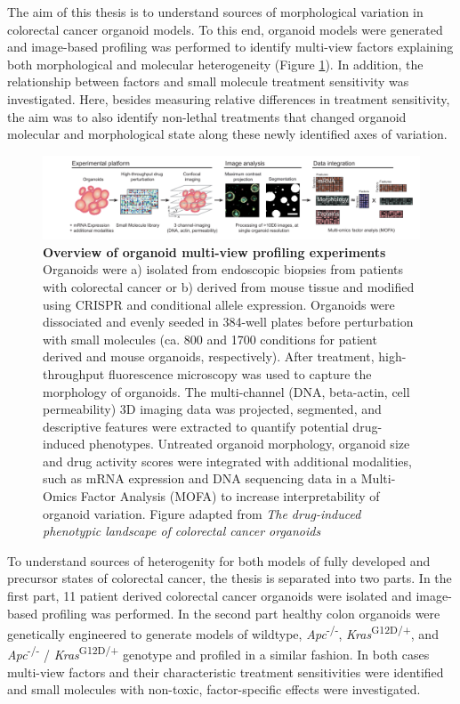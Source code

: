 \begin{flushleft}
The aim of this thesis is to understand sources of morphological variation in colorectal cancer organoid models. To this end, organoid models were generated and image-based profiling was performed to identify multi-view factors explaining both morphological and molecular heterogeneity (Figure \ref{fig_130}). In addition, the relationship between factors and small molecule treatment sensitivity was investigated. Here, besides measuring relative differences in treatment sensitivity, the aim was to also identify non-lethal treatments that changed organoid molecular and morphological state along these newly identified axes of variation.
\bigbreak

\begin{figure}[h]
\centering
\includegraphics[width=\textwidth,
                height=\textheight,
                keepaspectratio]{figures/promise/pdf/fig_1_1_1.pdf}
\caption[Overview of organoid multi-view profiling experiments]{\textbf{Overview of organoid multi-view profiling experiments} Organoids were a) isolated from endoscopic biopsies from patients with colorectal cancer or b) derived from mouse tissue and modified using CRISPR and conditional allele expression. Organoids were dissociated and evenly seeded in 384-well plates before perturbation with small molecules (ca. 800 and 1700 conditions for patient derived and mouse organoids, respectively). After treatment, high-throughput fluorescence microscopy was used to capture the morphology of organoids.  The multi-channel (DNA, beta-actin, cell permeability) 3D imaging data was projected, segmented, and descriptive features were extracted to quantify potential drug-induced phenotypes. Untreated organoid morphology, organoid size and drug activity scores were integrated with additional modalities, such as mRNA expression and DNA sequencing data in a Multi-Omics Factor Analysis (MOFA) to increase interpretability of organoid variation. Figure adapted from \textit{The drug-induced phenotypic landscape of colorectal cancer organoids} \parencite{betgeDruginducedPhenotypicLandscape2022}}
\label{fig_130}
\end{figure}

To understand sources of heterogenity for both models of fully developed and precursor states of colorectal cancer, the thesis is separated into two parts. In the first part, 11 patient derived colorectal cancer organoids were isolated and image-based profiling was performed. In the second part healthy colon organoids were genetically engineered to generate models of wildtype, \textit{Apc}\textsuperscript{-/-}, \textit{Kras}\textsuperscript{G12D/+}, and \textit{Apc}\textsuperscript{-/-} / \textit{Kras}\textsuperscript{G12D/+} genotype and profiled in a similar fashion. In both cases multi-view factors and their characteristic treatment sensitivities were identified and small molecules with non-toxic, factor-specific effects were investigated.


\end{flushleft}

